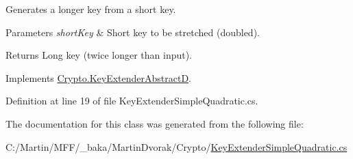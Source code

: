 Generates a longer key from a short key. 


\begin{DoxyParams}{Parameters}
{\em short\+Key} & Short key to be stretched (doubled).\\
\hline
\end{DoxyParams}
\begin{DoxyReturn}{Returns}
Long key (twice longer than input).
\end{DoxyReturn}


Implements \hyperlink{class_crypto_1_1_key_extender_abstract_d_ae403b92e9038b9c0bc7a21885e24ffc7}{Crypto.\+Key\+Extender\+Abstract\+D}.



Definition at line 19 of file Key\+Extender\+Simple\+Quadratic.\+cs.



The documentation for this class was generated from the following file\+:\begin{DoxyCompactItemize}
\item 
C\+:/\+Martin/\+M\+F\+F/\+\_\+baka/\+Martin\+Dvorak/\+Crypto/\hyperlink{_key_extender_simple_quadratic_8cs}{Key\+Extender\+Simple\+Quadratic.\+cs}\end{DoxyCompactItemize}
